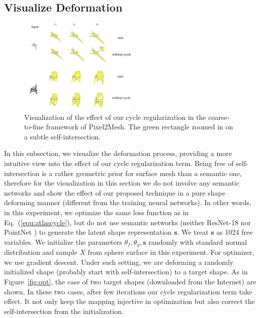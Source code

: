 \subsection{Visualize Deformation}
\label{subsec:deform}
\begin{figure}
	\begin{center}
		\includegraphics[width=0.5\textwidth]{img/p2m/3level}
	\end{center}
	\caption{Visualization of the effect of our cycle regularization in the coarse-to-fine framework of Pixel2Mesh. The green rectangle zoomed in on a subtle self-intersection.}
	\label{fig:3level}
\end{figure}
In this subsection, we visualize the deformation process, providing a more intuitive view into the effect of our cycle regularization term. Being free of self-intersection is a rather geometric prior for surface mesh than a semantic one, therefore for the visualization in this section we do not involve any semantic networks and show the effect of our proposed technique in a pure shape deforming manner (different from the training neural networks). In other words, in this experiment, we optimize the same loss function as in Eq.~(\ref{equ:atlascycle}), but do not use semantic networks (neither ResNet-18 \cite{resnet} nor PointNet \cite{pointnet}) to generate the latent shape representation $\mathbf{s}$. We treat $\mathbf{s}$ as 1024 free variables. We initialize the parameters $\theta_f,\theta_g,\mathbf{s}$ randomly with standard normal distribution and sample $X$ from sphere surface in this experiment. For optimizer, we use gradient descent. Under such setting, we are deforming a randomly initialized shape (probably start with self-intersection) to a target shape. As in Figure~\ref{fig:opt}, the case of two target shapes (downloaded from the Internet) are shown. In these two cases, after few iterations our cycle regularization term take effect. It not only keep the mapping injective in optimization but also correct the self-intersection from the initialization.

